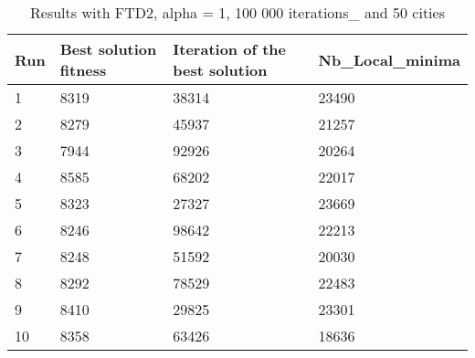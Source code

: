 \documentclass[12pt,oneside,a4paper]{article}
\begin{document}
\begin{table}[h]
  \centering
  \small
  \begin{tabular}{llll}
    \hline
    \multicolumn{1}{|l|}{\textbf{Run}}& \multicolumn{1}{l|}{\textbf{Best solution fitness}}& \multicolumn{1}{l|}{\textbf{Iteration of the best solution}}& \multicolumn{1}{l|}{\textbf{Nb\_Local\_minima}}\\ \hline
    \multicolumn{1}{|l|}{1} & \multicolumn{1}{l|}{8319}  & \multicolumn{1}{l|}{38314} & \multicolumn{1}{l|}{23490}  \\ \hline
    \multicolumn{1}{|l|}{2} & \multicolumn{1}{l|}{8279}  & \multicolumn{1}{l|}{45937} & \multicolumn{1}{l|}{21257}  \\ \hline
    \multicolumn{1}{|l|}{3} & \multicolumn{1}{l|}{7944}  & \multicolumn{1}{l|}{92926}  & \multicolumn{1}{l|}{20264}  \\ \hline
    \multicolumn{1}{|l|}{4} & \multicolumn{1}{l|}{8585}  & \multicolumn{1}{l|}{68202}  & \multicolumn{1}{l|}{22017}  \\ \hline
    \multicolumn{1}{|l|}{5} & \multicolumn{1}{l|}{8323}  & \multicolumn{1}{l|}{27327}  & \multicolumn{1}{l|}{23669}  \\ \hline
    \multicolumn{1}{|l|}{6} & \multicolumn{1}{l|}{8246}  & \multicolumn{1}{l|}{98642}  & \multicolumn{1}{l|}{22213}  \\ \hline
    \multicolumn{1}{|l|}{7} & \multicolumn{1}{l|}{8248}  & \multicolumn{1}{l|}{51592}  & \multicolumn{1}{l|}{20030}  \\ \hline
    \multicolumn{1}{|l|}{8} & \multicolumn{1}{l|}{8292}  & \multicolumn{1}{l|}{78529} & \multicolumn{1}{l|}{22483}  \\ \hline
    \multicolumn{1}{|l|}{9} & \multicolumn{1}{l|}{8410}  & \multicolumn{1}{l|}{29825} & \multicolumn{1}{l|}{23301}  \\ \hline
    \multicolumn{1}{|l|}{10} & \multicolumn{1}{l|}{8358}  & \multicolumn{1}{l|}{63426} & \multicolumn{1}{l|}{18636}  \\ \hline
  \end{tabular}
  \caption{Results with FTD2, alpha = 1, 100 000 iterations\_ and 50 cities}
\end{table}
\end{document}
